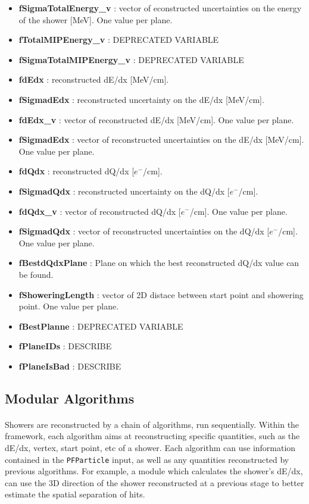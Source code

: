 \begin{itemize}
\item \textbf{fSigmaTotalEnergy\_v} : vector of econstructed uncertainties on the energy of the shower [MeV]. One value per plane.
\item \textbf{fTotalMIPEnergy\_v} : {\color{red} DEPRECATED VARIABLE}
\item \textbf{fSigmaTotalMIPEnergy\_v} : {\color{red} DEPRECATED VARIABLE}
\item \textbf{fdEdx} : reconstructed dE/dx [MeV/cm].
\item \textbf{fSigmadEdx} : reconstructed uncertainty on the dE/dx [MeV/cm].
\item \textbf{fdEdx\_v} : vector of reconstructed dE/dx [MeV/cm]. One value per plane.
\item \textbf{fSigmadEdx} : vector of reconstructed uncertainties on the dE/dx [MeV/cm]. One value per plane.
\item \textbf{fdQdx} : reconstructed dQ/dx [$e^-$/cm].
\item \textbf{fSigmadQdx} : reconstructed uncertainty on the dQ/dx [$e^-$/cm].
\item \textbf{fdQdx\_v} : vector of reconstructed dQ/dx [$e^-$/cm]. One value per plane.
\item \textbf{fSigmadQdx} : vector of reconstructed uncertainties on the dQ/dx [$e^-$/cm]. One value per plane.
\item \textbf{fBestdQdxPlane} : Plane on which the best reconstructed dQ/dx value can be found.
\item \textbf{fShoweringLength} : vector of 2D distace between start point and showering point. One value per plane.
\item \textbf{fBestPlanne} : {\color{red} DEPRECATED VARIABLE}
\item \textbf{fPlaneIDs} : {\color{red} DESCRIBE}
\item \textbf{fPlaneIsBad} : {\color{red} DESCRIBE}
   
\end{itemize}

\subsection{Modular Algorithms}
\paragraph{}Showers are reconstructed by a chain of algorithms, run sequentially. Within the framework, each algorithm aims at reconstructing specific quantities, such as the dE/dx, vertex, start point, etc of a shower. Each algorithm can use information contained in the \texttt{PFParticle} input, as well as any quantities reconstructed by previous algorithms. For example, a module which calculates the shower's dE/dx, can use the 3D direction of the shower reconstructed at a previous stage to better estimate the spatial separation of hits.

